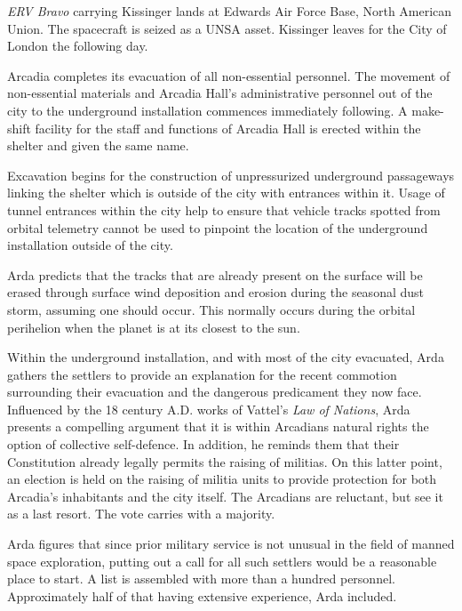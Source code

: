 {\it ERV Bravo} carrying Kissinger lands at Edwards Air Force Base, North American Union. The spacecraft is seized as a UNSA asset. Kissinger leaves for the City of London the following day.
\StopTimelineDate

Arcadia completes its evacuation of all non-essential personnel. The movement of non-essential materials and Arcadia Hall's administrative personnel out of the city to the underground installation commences immediately following. A make-shift facility for the staff and functions of Arcadia Hall is erected within the shelter and given the same name.

Excavation begins for the construction of unpressurized underground passageways linking the shelter which is outside of the city with entrances within it. Usage of tunnel entrances within the city help to ensure that vehicle tracks spotted from orbital telemetry cannot be used to pinpoint the location of the underground installation outside of the city. 

Arda predicts that the tracks that are already present on the surface will be erased through surface wind deposition and erosion during the seasonal dust storm, assuming one should occur. This normally occurs during the orbital perihelion when the planet is at its closest to the sun.

Within the underground installation, and with most of the city evacuated, Arda gathers the settlers to provide an explanation for the recent commotion surrounding their evacuation and the dangerous predicament they now face. Influenced by the 18 century A.D. works of Vattel's {\it Law of Nations}, Arda presents a compelling argument that it is within Arcadians natural rights the option of collective self-defence. In addition, he reminds them that their Constitution already legally permits the raising of militias. On this latter point, an election is held on the raising of militia units to provide protection for both Arcadia's inhabitants and the city itself. The Arcadians are reluctant, but see it as a last resort. The vote carries with a majority.

Arda figures that since prior military service is not unusual in the field of manned space exploration, putting out a call for all such settlers would be a reasonable place to start. A list is assembled with more than a hundred personnel. Approximately half of that having extensive experience, Arda included.
\StopTimelineDate

